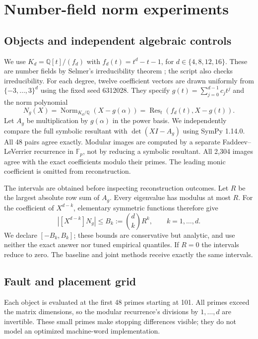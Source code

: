 \documentclass[11pt]{article}
\theoremstyle{definition}\newtheorem{definition}[theorem]{Definition}
\begin{document}
\section{Number-field norm experiments}
\subsection{Objects and independent algebraic controls}
We use $K_d=\mathbb Q[t]/(f_d)$ with $f_d(t)=t^d-t-1$, for $d\in\{4,8,12,16\}$. These are number fields by Selmer's irreducibility theorem \cite{selmer}; the script also checks irreducibility. For each degree, twelve coefficient vectors are drawn uniformly from $\{-3,\ldots,3\}^d$ using the fixed seed 6312028. They specify $g(t)=\sum_{j=0}^{d-1}c_jt^j$ and the norm polynomial
\begin{equation}\label{eq:norm}
 N_g(X)=\operatorname{Norm}_{K_d/\mathbb Q}(X-g(\alpha))
       =\operatorname{Res}_t(f_d(t),X-g(t)).
\end{equation}
Let $A_g$ be multiplication by $g(\alpha)$ in the power basis. We independently compare the full symbolic resultant with $\det(XI-A_g)$ using SymPy 1.14.0. All 48 pairs agree exactly. Modular images are computed by a separate Faddeev--LeVerrier recurrence in $\mathbb F_p$, not by reducing a symbolic resultant. All 2,304 images agree with the exact coefficients modulo their primes. The leading monic coefficient is omitted from reconstruction.

The intervals are obtained before inspecting reconstruction outcomes. Let $R$ be the largest absolute row sum of $A_g$. Every eigenvalue has modulus at most $R$. For the coefficient of $X^{d-k}$, elementary symmetric functions therefore give
\begin{equation}\label{eq:bounds}
 |[X^{d-k}]N_g|\le B_k:=\binom dk R^k,\qquad k=1,\ldots,d.
\end{equation}
We declare $[-B_k,B_k]$; these bounds are conservative but analytic, and use neither the exact answer nor tuned empirical quantiles. If $R=0$ the intervals reduce to zero. The baseline and joint methods receive exactly the same intervals.

\subsection{Fault and placement grid}
Each object is evaluated at the first 48 primes starting at 101. All primes exceed the matrix dimensions, so the modular recurrence's divisions by $1,\ldots,d$ are invertible. These small primes make stopping differences visible; they do not model an optimized machine-word implementation.
\end{document}
